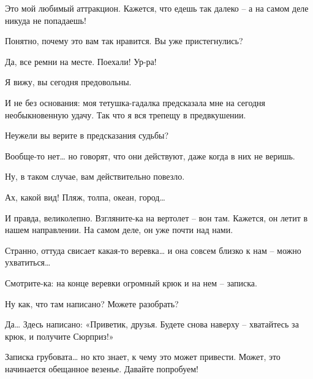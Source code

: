 \documentclass[../main.tex]{subfiles}
\begin{document}


\begin{Dialogue}


 Это мой любимый аттракцион. Кажется, что едешь так далеко \--- а на самом деле никуда не попадаешь!

 Понятно, почему это вам так нравится. Вы уже пристегнулись?

 Да, все ремни на месте. Поехали! Ур-ра!

 Я вижу, вы сегодня предовольны.

 И не без основания: моя тетушка-гадалка предсказала мне на сегодня необыкновенную удачу. Так что я вся трепещу в предвкушении.

 Неужели вы верите в предсказания судьбы?

 Вообще-то нет\ldots{} но говорят, что они действуют, даже когда в них не веришь.

 Ну, в таком случае, вам действительно повезло.

 Ах, какой вид! Пляж, толпа, океан, город\ldots{}

 И правда, великолепно. Взгляните-ка на вертолет \--- вон там. Кажется, он летит в нашем направлении. На самом деле, он уже почти над нами.

 Странно, оттуда свисает какая-то веревка\ldots{} и она совсем близко к нам \--- можно ухватиться\ldots{}

 Смотрите-ка: на конце веревки огромный крюк и на нем \--- записка.


 Ну как, что там написано? Можете разобрать?

 Да\ldots{} Здесь написано: «Приветик, друзья. Будете снова наверху \--- хватайтесь за крюк, и получите Сюрприз!»

 Записка грубовата\ldots{} но кто знает, к чему это может привести. Может, это начинается обещанное везенье. Давайте попробуем!


\end{Dialogue}
\end{document}
